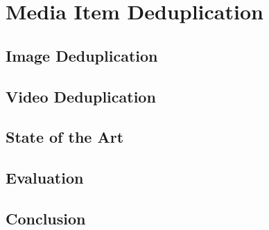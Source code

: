 

\chapter{Media Item Deduplication}

\ifpdf
    \graphicspath{{6_media_item_deduplication/figures/PNG/}{6_media_item_deduplication/figures/PDF/}{6_media_item_deduplication/figures/}}
\else
    \graphicspath{{6_media_item_deduplication/figures/EPS/}{6_media_item_deduplication/figures/}}
\fi


\section{Image Deduplication}

\section{Video Deduplication}

\section{State of the Art}

\section{Evaluation}

\section{Conclusion}
